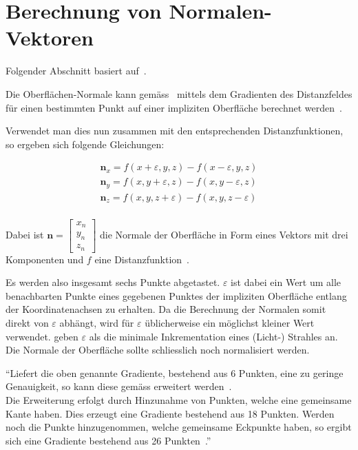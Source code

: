 
\section{Berechnung von Normalen-Vektoren}
\label{sec:rendering:normals}

Folgender Abschnitt basiert auf~\cite[S. 42 bis
43]{osterwalder_sven_volume_2016}.

Die Oberflächen-Normale kann gemäss~\citeauthor{hart_ray_1989} mittels dem
Gradienten des Distanzfeldes für einen bestimmten Punkt auf einer impliziten
Oberfläche berechnet werden~\parencite[S. 292 bis 293]{hart_ray_1989}.

Verwendet man dies nun zusammen mit den entsprechenden Distanzfunktionen, so
ergeben sich folgende Gleichungen:

\begin{gather}
    \bm{n}_{x} = f(x + \varepsilon, y, z) - f(x - \varepsilon, y, z) \\
    \bm{n}_{y} = f(x, y + \varepsilon,  z) - f(x, y - \varepsilon,  z) \\
    \bm{n}_{z} = f(x, y, z + \varepsilon) - f(x, y, z - \varepsilon) \\
\end{gather}

Dabei ist $\bm{n} = \begin{bmatrix} x_{n} \\ y_{n} \\ z_{n} \end{bmatrix}$ die
Normale der Oberfläche in Form eines Vektors mit drei Komponenten und $f$ eine
Distanzfunktion~\parencites[S. 292 bis 293]{hart_ray_1989}[S.
13]{hart_ray_1993}.

Es werden also insgesamt sechs Punkte abgetastet. $\varepsilon$ ist dabei ein
Wert um alle benachbarten Punkte eines gegebenen Punktes der impliziten
Oberfläche entlang der Koordinatenachsen zu erhalten. Da die Berechnung der
Normalen somit direkt von $\varepsilon$ abhängt, wird für $\varepsilon$
üblicherweise ein möglichst kleiner Wert verwendet.  \citeauthor{hart_ray_1989}
geben $\varepsilon$ als die minimale Inkrementation eines (Licht-) Strahles an.
Die Normale der Oberfläche sollte schliesslich noch normalisiert werden.

``Liefert die oben genannte Gradiente, bestehend aus 6 Punkten, eine zu
geringe Genauigkeit, so kann diese gemäss \citeauthor{hart_ray_1989}
erweitert werden~\parencite[S. 293]{hart_ray_1989}.\\
Die Erweiterung erfolgt durch Hinzunahme von Punkten, welche eine
gemeinsame Kante haben. Dies erzeugt eine Gradiente bestehend aus 18
Punkten. Werden noch die Punkte hinzugenommen, welche gemeinsame
Eckpunkte haben, so ergibt sich eine Gradiente bestehend aus 26
Punkten~\parencite[S. 293]{hart_ray_1989}.''~\cite[S.
43]{osterwalder_sven_volume_2016}

